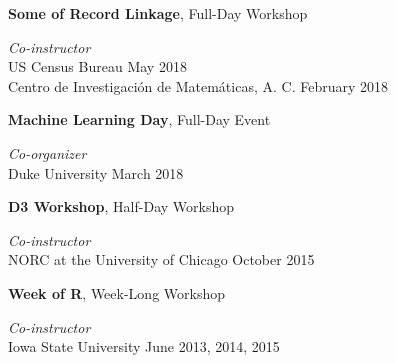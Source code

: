 \documentclass[margin,line]{res}
\begin{document}
\begin{resume}
{\bf Some of Record Linkage},  Full-Day Workshop

\vspace{-.4cm}
{\em Co-instructor} \hfill \\

\vspace{-.7cm}
US Census Bureau \hfill May 2018 \\

\vspace{-.7cm}
Centro de Investigaci\'{o}n de Matem\'{a}ticas, A. C. \hfill February 2018



{\bf Machine Learning Day}, Full-Day Event

\vspace{-.4cm}
{\em Co-organizer} \hfill \\

\vspace{-.7cm}
Duke University \hfill March 2018


{\bf D3 Workshop}, Half-Day Workshop

\vspace{-.4cm}
{\em Co-instructor} \hfill \\

\vspace{-.7cm}
NORC at the University of Chicago \hfill October 2015


{\bf Week of R}, Week-Long Workshop

\vspace{-.4cm}
{\em Co-instructor} \hfill \\

\vspace{-.7cm}
Iowa State University \hfill June 2013, 2014, 2015




\end{resume}
\end{document}
